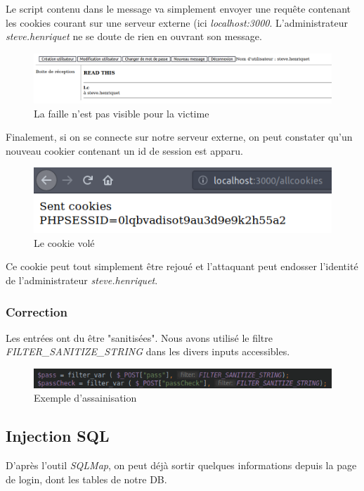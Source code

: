 \documentclass[12pt]{article}
\begin{document}
Le script contenu dans le message va simplement envoyer une requête contenant les cookies courant sur une serveur externe (ici \textit{localhost:3000}. L'administrateur \textit{steve.henriquet} ne se doute de rien en ouvrant son message.

\begin{figure}[H]
\centering
\includegraphics[width=\linewidth]{images/cookieStealing.png}
\caption{La faille n'est pas visible pour la victime}
\end{figure}

Finalement, si on se connecte sur notre serveur externe, on peut constater qu'un nouveau cookier contenant un id de session est apparu.

\begin{figure}[H]
\centering
\includegraphics[width=\linewidth]{images/cookieStolen.png}
\caption{Le cookie volé}
\end{figure}

Ce cookie peut tout simplement être rejoué et l'attaquant peut endosser l'identité de l'administrateur \textit{steve.henriquet}.


\subsubsection{Correction}
Les entrées ont du être "sanitisées". Nous avons utilisé le filtre \textit{FILTER\_SANITIZE\_STRING} dans les divers inputs accessibles.
\begin{figure}[H]
\centering
\includegraphics[width=\linewidth]{images/sanitize.png}
\caption{Exemple d'assainisation}
\end{figure}

\subsection{Injection SQL}
D'après l'outil \textit{SQLMap}, on peut déjà sortir quelques informations depuis la page de login, dont les tables de notre DB. 
\end{document}

